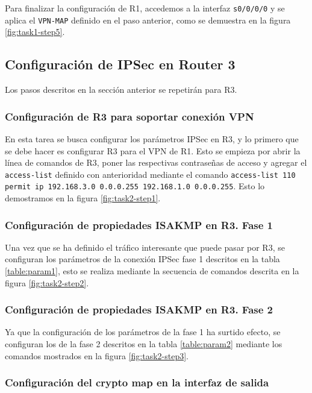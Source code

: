 \documentclass{article}
\begin{document}
                Para finalizar la configuración de R1, accedemos a la interfaz \texttt{s0/0/0/0} y se aplica el \texttt{VPN-MAP} definido en el paso anterior, como se demuestra en la figura \ref{fig:task1-step5}.

        \subsection{Configuración de IPSec en Router 3} \label{sec:ipsec-r3}

            Los pasos descritos en la sección anterior se repetirán para R3.

            \subsubsection{Configuración de R3 para soportar conexión VPN}

                En esta tarea se busca configurar los parámetros IPSec en R3, y lo primero que se debe hacer es configurar R3 para el VPN de R1. Esto se empieza por abrir la línea de comandos de R3, poner las respectivas contraseñas de acceso y agregar el \texttt{access-list} definido con anterioridad mediante el comando \texttt{access-list 110 permit ip 192.168.3.0 0.0.0.255 192.168.1.0 0.0.0.255}. Esto lo demostramos en la figura \ref{fig:task2-step1}.

            \subsubsection{Configuración de propiedades ISAKMP en R3. Fase 1}

                Una vez que se ha definido el tráfico interesante que puede pasar por R3, se configuran los parámetros de la conexión IPSec fase 1 descritos en la tabla \ref{table:param1}, esto se realiza mediante la secuencia de comandos descrita en la figura \ref{fig:task2-step2}.

            \subsubsection{Configuración de propiedades ISAKMP en R3. Fase 2}

                Ya que la configuración de los parámetros de la fase 1 ha surtido efecto, se configuran los de la fase 2 descritos en la tabla \ref{table:param2} mediante los comandos mostrados en la figura \ref{fig:task2-step3}.

            \subsubsection{Configuración del crypto map en la interfaz de salida}
\end{document}
